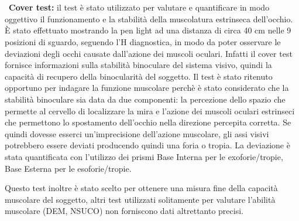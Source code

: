 \\\ \\\
\textbf{Cover test:} il test è stato utilizzato per valutare e quantificare in modo oggettivo il funzionamento e la stabilità della muscolatura estrinseca dell’occhio. È stato effettuato mostrando la pen light ad una distanza di circa 40 cm nelle 9 posizioni di sguardo, seguendo l’H diagnostica, in modo da poter osservare le deviazioni degli occhi causate dall'azione dei muscoli oculari. Infatti il cover test fornisce informazioni sulla stabilità binoculare del sistema visivo, quindi la capacità di recupero della binocularità del soggetto. Il test è stato ritenuto opportuno per indagare la funzione muscolare perchè è stato considerato che la stabilità binoculare sia data da due componenti: la percezione dello spazio che permette al cervello di localizzare la mira e l'azione dei muscoli oculari estrinseci che permettono lo spostamento dell'occhio nella direzione percepita corretta. Se quindi dovesse esserci un'imprecisione dell'azione muscolare, gli assi visivi potrebbero essere deviati producendo quindi una foria o tropia. La deviazione è stata quantificata con l’utilizzo dei prismi Base Interna per le exoforie/tropie, Base Esterna per le esoforie/tropie. 

Questo test inoltre è stato scelto per ottenere una misura fine della capacità muscolare del soggetto, altri test utilizzati solitamente per valutare l'abilità muscolare (DEM, NSUCO) non forniscono dati altrettanto precisi.

